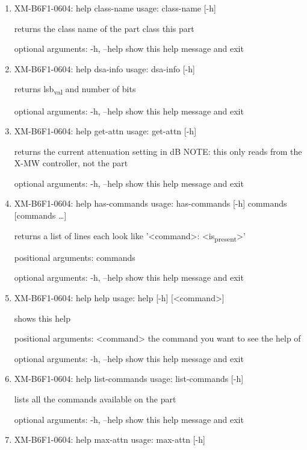 \documentclass[11pt]{article}
\begin{document}
\begin{enumerate}
\item XM-B6F1-0604: help class-name
\label{sec:orga6063f3}
usage: class-name [-h]

returns the class name of the part class this part

optional arguments:
  -h, --help  show this help message and exit

\item XM-B6F1-0604: help dsa-info
\label{sec:orgbf5087e}
usage: dsa-info [-h]

returns lsb\textsubscript{val} and number of bits

optional arguments:
  -h, --help  show this help message and exit

\item XM-B6F1-0604: help get-attn
\label{sec:orge9d5211}
usage: get-attn [-h]

returns the current attenuation setting in dB NOTE: this only reads from the
X-MW controller, not the part

optional arguments:
  -h, --help  show this help message and exit

\item XM-B6F1-0604: help has-commands
\label{sec:orgfb06ecc}
usage: has-commands [-h] commands [commands \ldots{}]

returns a list of lines each look like '<command>: <is\textsubscript{present}>'

positional arguments:
  commands

optional arguments:
  -h, --help  show this help message and exit

\item XM-B6F1-0604: help help
\label{sec:orgfd1b585}
usage: help [-h] [<command>]

shows this help

positional arguments:
  <command>   the command you want to see the help of

optional arguments:
  -h, --help  show this help message and exit

\item XM-B6F1-0604: help list-commands
\label{sec:orgd0df7f6}
usage: list-commands [-h]

lists all the commands available on the part

optional arguments:
  -h, --help  show this help message and exit

\item XM-B6F1-0604: help max-attn
\label{sec:org9e3476f}
usage: max-attn [-h]


\end{enumerate}
\end{document}

